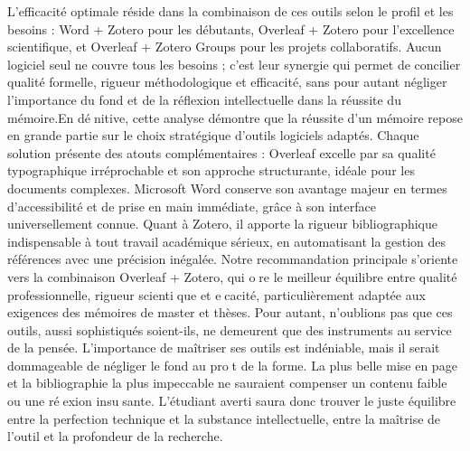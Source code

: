 \documentclass[12pt,a4paper]{article}
\begin{document}
{		L’efficacité optimale réside dans la combinaison de ces outils selon le profil et les besoins : Word + Zotero pour les débutants, Overleaf + Zotero pour l’excellence scientifique, et Overleaf + Zotero Groups pour les projets collaboratifs. Aucun logiciel seul ne couvre tous les besoins ; c’est leur synergie qui permet de concilier qualité formelle, rigueur méthodologique et efficacité, sans pour autant négliger l’importance du fond et de la réflexion intellectuelle dans la réussite du mémoire.En dénitive, cette analyse démontre que la réussite d'un mémoire repose en grande partie sur le choix stratégique d'outils logiciels adaptés. Chaque solution présente des atouts complémentaires : Overleaf excelle par sa qualité typographique irréprochable et son approche structurante, idéale pour les documents complexes. Microsoft Word conserve son avantage majeur en termes d'accessibilité et de prise en main immédiate, grâce à son interface universellement connue. Quant à Zotero, il apporte la rigueur bibliographique indispensable à tout travail académique sérieux, en automatisant la gestion des références avec une précision inégalée. Notre recommandation principale s'oriente vers la combinaison Overleaf + Zotero, qui ore le meilleur équilibre entre qualité professionnelle, rigueur scientique et ecacité, particulièrement adaptée aux exigences des mémoires de master et thèses. Pour autant, n'oublions pas que ces outils, aussi sophistiqués soient-ils, ne demeurent que des instruments au service de la pensée. L'importance de maîtriser ses outils est indéniable, mais il serait dommageable de négliger le fond au prot de la forme. La plus belle mise en page et la bibliographie la plus impeccable ne sauraient compenser un contenu faible ou une réexion insusante. L'étudiant averti saura donc trouver le juste équilibre entre la perfection technique et la substance intellectuelle, entre la maîtrise de l'outil et la profondeur de la recherche.\\[1.5 cm]
		
		
}
\end{document}
